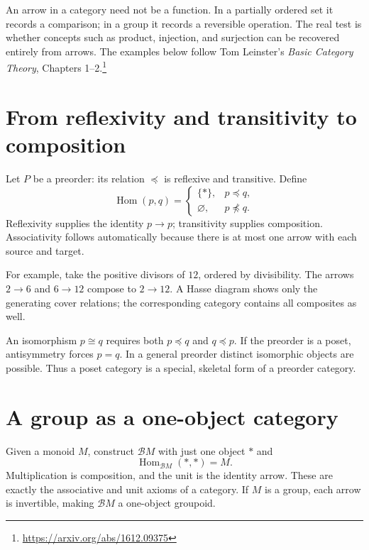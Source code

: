 
An arrow in a category need not be a function. In a partially ordered set it records a comparison; in a group it records a reversible operation. The real test is whether concepts such as product, injection, and surjection can be recovered entirely from arrows. The examples below follow Tom Leinster's \emph{Basic Category Theory}, Chapters 1--2.\footnote{\url{https://arxiv.org/abs/1612.09375}}

\section{From reflexivity and transitivity to composition}

Let \(P\) be a preorder: its relation \(\preceq\) is reflexive and transitive. Define
\[
 \operatorname{Hom}(p,q)=
 \begin{cases}\{*\},&p\preceq q,\\ \varnothing,&p\npreceq q.\end{cases}
\]
Reflexivity supplies the identity \(p\to p\); transitivity supplies composition. Associativity follows automatically because there is at most one arrow with each source and target.

For example, take the positive divisors of \(12\), ordered by divisibility. The arrows \(2\to6\) and \(6\to12\) compose to \(2\to12\). A Hasse diagram shows only the generating cover relations; the corresponding category contains all composites as well.

An isomorphism \(p\cong q\) requires both \(p\preceq q\) and \(q\preceq p\). If the preorder is a poset, antisymmetry forces \(p=q\). In a general preorder distinct isomorphic objects are possible. Thus a poset category is a special, skeletal form of a preorder category.

\section{A group as a one-object category}

Given a monoid \(M\), construct \(\mathcal BM\) with just one object \(*\) and
\[
 \operatorname{Hom}_{\mathcal BM}(*,*)=M.
\]
Multiplication is composition, and the unit is the identity arrow. These are exactly the associative and unit axioms of a category. If \(M\) is a group, each arrow is invertible, making \(\mathcal BM\) a one-object groupoid.


